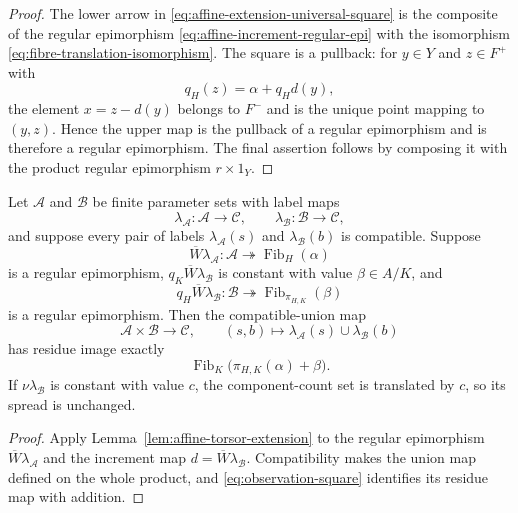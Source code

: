 \begin{proof}
The lower arrow in \eqref{eq:affine-extension-universal-square} is the composite of the regular epimorphism \eqref{eq:affine-increment-regular-epi} with the isomorphism \eqref{eq:fibre-translation-isomorphism}.  The square is a pullback: for $y\in Y$ and $z\in F^+$ with
\[
q_H(z)=\alpha+q_Hd(y),
\]
the element $x=z-d(y)$ belongs to $F^-$ and is the unique point mapping to $(y,z)$.  Hence the upper map is the pullback of a regular epimorphism and is therefore a regular epimorphism.  The final assertion follows by composing it with the product regular epimorphism $r\times1_Y$.
\end{proof}

\begin{corollary}\label{cor:compatible-affine-extension}
Let $\mathscr A$ and $\mathscr B$ be finite parameter sets with label maps
\[
\lambda_{\mathscr A}:\mathscr A\to\mathcal C,
\qquad
\lambda_{\mathscr B}:\mathscr B\to\mathcal C,
\]
and suppose every pair of labels $\lambda_{\mathscr A}(s)$ and $\lambda_{\mathscr B}(b)$ is compatible.  Suppose
\[
\overline W\lambda_{\mathscr A}:\mathscr A\twoheadrightarrow\operatorname{Fib}_H(\alpha)
\]
is a regular epimorphism, $q_K\overline W\lambda_{\mathscr B}$ is constant with value $\beta\in A/K$, and
\begin{equation}\label{eq:compatible-affine-quotient-epi}
q_H\overline W\lambda_{\mathscr B}:\mathscr B\twoheadrightarrow
\operatorname{Fib}_{\pi_{H,K}}(\beta)
\end{equation}
is a regular epimorphism.  Then the compatible-union map
\[
\mathscr A\times\mathscr B\longrightarrow\mathcal C,
\qquad
(s,b)\longmapsto\lambda_{\mathscr A}(s)\cup\lambda_{\mathscr B}(b)
\]
has residue image exactly
\[
\operatorname{Fib}_K\!\bigl(\pi_{H,K}(\alpha)+\beta\bigr).
\]
If $\nu\lambda_{\mathscr B}$ is constant with value $c$, the component-count set is translated by $c$, so its spread is unchanged.
\end{corollary}

\begin{proof}
Apply Lemma~\ref{lem:affine-torsor-extension} to the regular epimorphism $\overline W\lambda_{\mathscr A}$ and the increment map $d=\overline W\lambda_{\mathscr B}$.  Compatibility makes the union map defined on the whole product, and \eqref{eq:observation-square} identifies its residue map with addition.
\end{proof}

